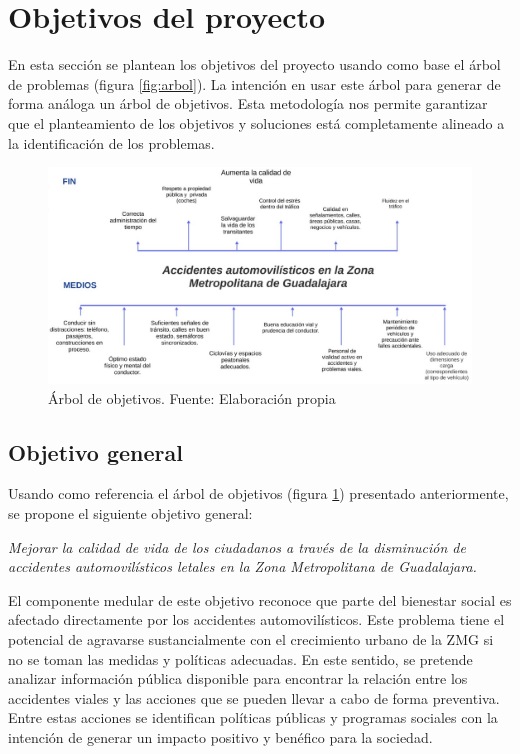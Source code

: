 \documentclass{article}
\newcommand{\forceindent}{\leavevmode{\parindent=1em\indent}}
\begin{document}
\newpage
\section{Objetivos del proyecto}\label{sec:objs}

En esta sección se plantean los objetivos del proyecto usando como base el
árbol de problemas (figura \ref{fig:arbol}). La intención en usar este árbol para generar
de forma análoga un árbol de objetivos. Esta metodología nos permite garantizar que
el planteamiento de los objetivos y soluciones está completamente alineado a la identificación
de los problemas. 

	\begin{figure}[H]\centering
	\includegraphics[width=1\textwidth]{resources/img/arbol_de_objetivos.png}
	\caption{\label{fig:arbol_obj} Árbol de objetivos. Fuente: Elaboración propia}
    \end{figure}


\subsection{Objetivo general}\label{subsec:general-objs}

Usando como referencia el árbol de objetivos (figura \ref{fig:arbol_obj}) presentado anteriormente, se propone el siguiente objetivo general:

\forceindent \textit{Mejorar la calidad de vida de los ciudadanos a través de la disminución de accidentes automovilísticos letales en la
Zona Metropolitana de Guadalajara.}

El componente medular de este objetivo reconoce que parte del bienestar social es afectado directamente por los accidentes automovilísticos. Este problema tiene el potencial de agravarse sustancialmente con el crecimiento urbano de la ZMG si no se toman las medidas y políticas adecuadas. En este sentido, se pretende analizar información pública disponible para encontrar la relación entre los accidentes viales y las acciones que se pueden llevar a cabo de forma preventiva. Entre estas acciones se identifican políticas públicas y programas sociales con la intención de generar un impacto positivo y benéfico para la sociedad. 
\end{document}
